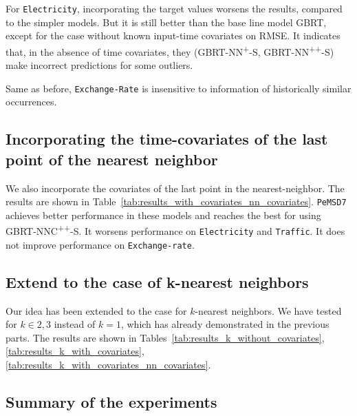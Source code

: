 For \texttt{Electricity}, incorporating the target values worsens the results, compared to the simpler models. But it is still better than the base line model \textsf{GBRT}, except for the case without known input-time covariates on RMSE.
It indicates that, in the absence of time covariates, they (\textsf{GBRT-NN\textsuperscript{+}-S}, \textsf{GBRT-NN\textsuperscript{++}-S}) make incorrect predictions for some outliers.

Same as before, \texttt{Exchange-Rate} is insensitive to information of historically similar occurrences. 


\subsection{Incorporating the time-covariates of the last point of the nearest neighbor} %


We also incorporate the covariates of the last point in the nearest-neighbor. The results are shown in Table~\ref{tab:results_with_covariates_nn_covariates}.
\texttt{PeMSD7} achieves better performance in these models and reaches the best for using \textsf{GBRT-NNC\textsuperscript{++}-S}.
It worsens performance on \texttt{Electricity} and \texttt{Traffic}.
It does not improve performance on \texttt{Exchange-rate}.

\subsection{Extend to the case of k-nearest neighbors} %




Our idea has been extended to the case for $k$-nearest neighbors.
We have tested for $k \in 2,3$ instead of $k=1$, which has already demonstrated in the previous parts.
The results are shown in Tables~\ref{tab:results_k_without_covariates}, \ref{tab:results_k_with_covariates}, \ref{tab:results_k_with_covariates_nn_covariates}.

\subsection{Summary of the experiments} %

